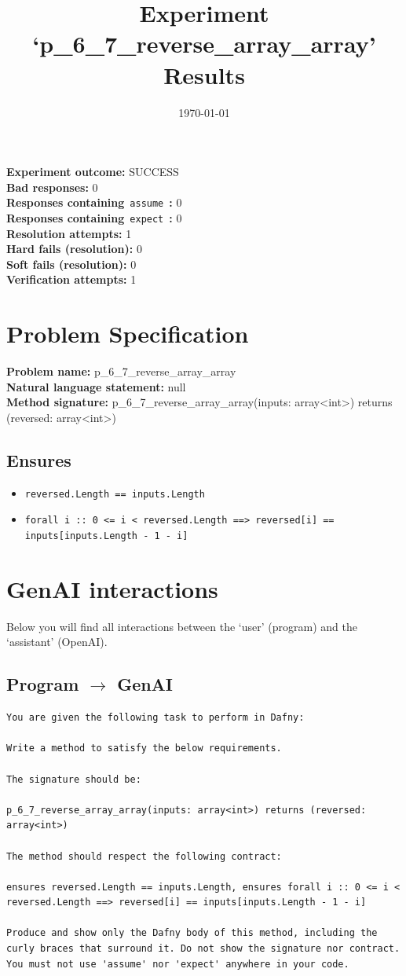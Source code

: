 \documentclass{article}
\begin{document}
\title{Experiment `p\_6\_7\_reverse\_array\_array' Results}
\author{\today}
\date{}
\maketitle
\textbf{Experiment outcome: }SUCCESS
\\\textbf{Bad responses: }0
\\\textbf{Responses containing}~\texttt{assume}~\textbf{: }0
\\\textbf{Responses containing}~\texttt{expect}~\textbf{: }0
\\\textbf{Resolution attempts: }1
\\\textbf{Hard fails (resolution): }0
\\\textbf{Soft fails (resolution): }0
\\\textbf{Verification attempts: }1
\section*{Problem Specification}
\textbf{Problem name: }p\_6\_7\_reverse\_array\_array
\\\textbf{Natural language statement: }null
\\\textbf{Method signature: }p\_6\_7\_reverse\_array\_array(inputs: array<int>) returns (reversed: array<int>)
\subsection*{Ensures}
\begin{itemize}
\item \texttt{reversed.Length == inputs.Length}
\item \texttt{forall i :: 0 <= i < reversed.Length ==> reversed[i] == inputs[inputs.Length - 1 - i]}
\end{itemize}
\clearpage
\section*{GenAI interactions}
Below you will find all interactions between the `user' (program) and the `assistant' (OpenAI).
\subsection*{Program $\rightarrow$ GenAI}
\begin{lstlisting}
You are given the following task to perform in Dafny:

Write a method to satisfy the below requirements.

The signature should be:

p_6_7_reverse_array_array(inputs: array<int>) returns (reversed: array<int>)

The method should respect the following contract:

ensures reversed.Length == inputs.Length, ensures forall i :: 0 <= i < reversed.Length ==> reversed[i] == inputs[inputs.Length - 1 - i]

Produce and show only the Dafny body of this method, including the curly braces that surround it. Do not show the signature nor contract. You must not use 'assume' nor 'expect' anywhere in your code.
\end{lstlisting}
\end{document}
